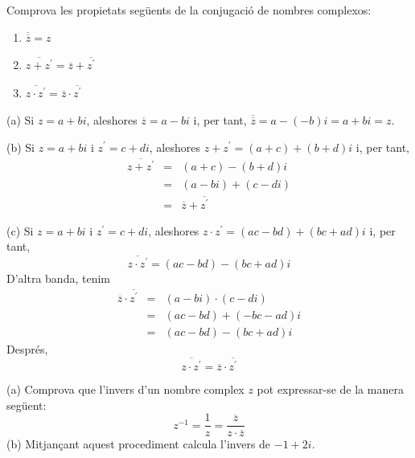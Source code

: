 \begin{exemple}
Comprova les propietats següents de la conjugació de nombres
complexos:

\begin{enumerate}
\item[a)] $\overline{\overline{z}}=z$

\item[b)] $\overline{z+z^{\prime }}=\overline{z}+\overline{z^{\prime }}$

\item[c)] $\overline{z\cdot z^{\prime }}=\overline{z}\cdot \overline{
z^{\prime }}$
\end{enumerate}
\end{exemple}

\begin{solucio}
(a) Si $z=a+bi$, aleshores \thinspace $\overline{z}=a-bi$ i, per tant, $
\overline{\overline{z}}=a-(-b)i=a+bi=z$.

(b) Si $z=a+bi$ i $z^{\prime }=c+di$, aleshores \thinspace $z+z^{\prime
}=(a+c)+(b+d)i$ i, per tant,
\begin{eqnarray*}
\overline{z+z^{\prime }} &=&(a+c)-(b+d)i \\
&=&(a-bi)+(c-di) \\
&=&\overline{z}+\overline{z^{\prime }}
\end{eqnarray*}

(c) Si $z=a+bi$ i $z^{\prime }=c+di$, aleshores \thinspace $z\cdot z^{\prime
}=(ac-bd)+(bc+ad)i$ i, per tant,
\begin{equation*}
\overline{z\cdot z^{\prime }}=(ac-bd)-(bc+ad)i
\end{equation*}
D’altra banda, tenim
\begin{eqnarray*}
\overline{z}\cdot \overline{z^{\prime }} &=&(a-bi)\cdot (c-di) \\
&=&(ac-bd)+(-bc-ad)i \\
&=&(ac-bd)-(bc+ad)i
\end{eqnarray*}
Després,
\begin{equation*}
\overline{z\cdot z^{\prime }}=\overline{z}\cdot \overline{z^{\prime }}
\end{equation*}
\end{solucio}

\begin{exemple}
(a) Comprova que l’invers d’un nombre complex $z$ pot expressar-se
de la manera següent:
\begin{equation*}
z^{-1}=\frac{1}{z}=\frac{\overline{z}}{z\cdot \overline{z}}
\end{equation*}
(b) Mitjançant aquest procediment calcula l’invers de $-1+2i$.
\end{exemple}

